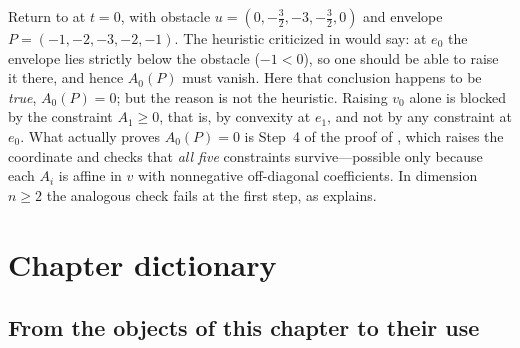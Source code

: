 \begin{example}
\label{ex:ch27-naive-failure-chain}
Return to  at \(t=0\), with obstacle
\(u=(0,-\tfrac32,-3,-\tfrac32,0)\) and envelope
\(P=(-1,-2,-3,-2,-1)\).  The heuristic criticized in
 would say: at \(e_0\) the envelope lies
strictly below the obstacle (\(-1<0\)), so one should be able to raise it
there, and hence \(A_0(P)\) must vanish.  Here that conclusion happens to be
\emph{true}, \(A_0(P)=0\); but the reason is not the heuristic.  Raising
\(v_0\) alone is blocked by the constraint \(A_1\geq0\), that is, by
convexity at \(e_1\), and not by any constraint at \(e_0\).  What actually
proves \(A_0(P)=0\) is Step~4 of the proof of
, which raises the coordinate and
checks that \emph{all five} constraints survive---possible only because each
\(A_i\) is affine in \(v\) with nonnegative off-diagonal coefficients.  In
dimension \(n\geq2\) the analogous check fails at the first step, as
 explains.
\end{example}

\section{Chapter dictionary}
\label{sec:ch27-dictionary}

\subsection{From the objects of this chapter to their use}
\label{sec:ch27-dict-forward}

